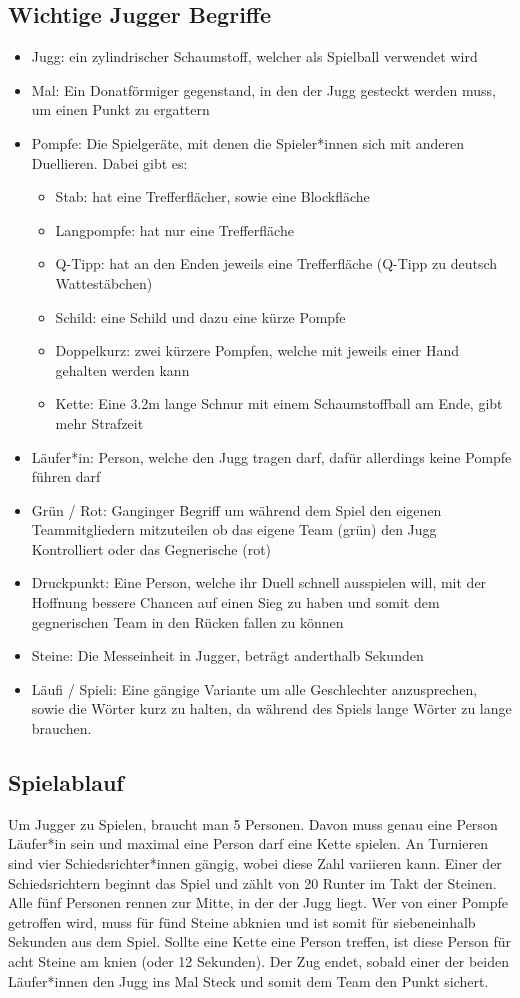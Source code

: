 \documentclass{article}
\begin{document}
\subsection{Wichtige Jugger Begriffe}
\begin{itemize}
\item Jugg: ein zylindrischer Schaumstoff, welcher als Spielball verwendet wird 
\item Mal: Ein Donatförmiger gegenstand, in den der Jugg gesteckt werden muss, um einen Punkt zu ergattern
\item Pompfe: Die Spielgeräte, mit denen die Spieler*innen sich mit anderen Duellieren. Dabei gibt es:
\begin{itemize}
    \item Stab: hat eine Trefferflächer, sowie eine Blockfläche
    \item Langpompfe: hat nur eine Trefferfläche
    \item Q-Tipp: hat an den Enden jeweils eine Trefferfläche (Q-Tipp zu deutsch Wattestäbchen)
    \item Schild: eine Schild und dazu eine kürze Pompfe
    \item Doppelkurz: zwei kürzere Pompfen, welche mit jeweils einer Hand gehalten werden kann
    \item Kette: Eine 3.2m lange Schnur mit einem Schaumstoffball am Ende, gibt mehr Strafzeit
\end{itemize} 
\item Läufer*in: Person, welche den Jugg tragen darf, dafür allerdings keine Pompfe führen darf
\item Grün / Rot: Ganginger Begriff um während dem Spiel den eigenen Teammitgliedern mitzuteilen ob das eigene Team (grün) den Jugg Kontrolliert oder das Gegnerische (rot)
\item Druckpunkt: Eine Person, welche ihr Duell schnell ausspielen will, mit der Hoffnung bessere Chancen auf einen Sieg zu haben und somit dem gegnerischen Team in den Rücken fallen zu können
\item Steine: Die Messeinheit in Jugger, beträgt anderthalb Sekunden
\item Läufi / Spieli: Eine gängige Variante um alle Geschlechter anzusprechen, sowie die Wörter kurz zu halten, da während des Spiels lange Wörter zu lange brauchen.
\end{itemize}
\subsection{Spielablauf}
Um Jugger zu Spielen, braucht man 5 Personen. Davon muss genau eine Person Läufer*in sein und maximal eine Person darf eine Kette spielen. An Turnieren sind vier Schiedsrichter*innen gängig, wobei diese Zahl variieren kann. Einer der Schiedsrichtern beginnt das Spiel und zählt von 20 Runter im Takt der Steinen. Alle fünf Personen rennen zur Mitte, in der der Jugg liegt. Wer von einer Pompfe getroffen wird, muss für fünd Steine abknien und ist somit für siebeneinhalb Sekunden aus dem Spiel. Sollte eine Kette eine Person treffen, ist diese Person für acht Steine am knien (oder 12 Sekunden). Der Zug endet, sobald einer der beiden Läufer*innen den Jugg ins Mal Steck und somit dem Team den Punkt sichert.
\end{document}
